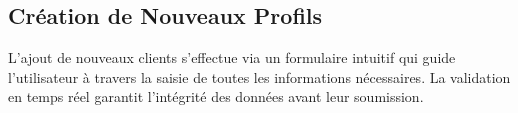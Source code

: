 \documentclass[10pt]{article}
\begin{document}

\vspace{0.8cm}

\subsection{Création de Nouveaux Profils}

\begin{infobox}[title=Processus de création de client]
    L'ajout de nouveaux clients s'effectue via un formulaire intuitif qui guide l'utilisateur 
    à travers la saisie de toutes les informations nécessaires. La validation en temps réel 
    garantit l'intégrité des données avant leur soumission.
\end{infobox}
\end{document}
